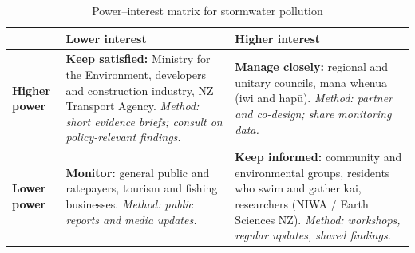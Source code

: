 \documentclass[11pt,a4paper]{article}
\begin{document}
\begin{table}[htbp]
  \centering
  \caption{Power--interest matrix for stormwater pollution}
  \label{tab:stakeholders}
  \renewcommand{\arraystretch}{1.25}
  \begin{tabularx}{\textwidth}{@{}l X X@{}}
    \toprule
    & \textbf{Lower interest} & \textbf{Higher interest} \\
    \midrule
    \textbf{Higher power} &
      \textbf{Keep satisfied:} Ministry for the Environment, developers and construction industry, NZ Transport Agency. \emph{Method: short evidence briefs; consult on policy-relevant findings.} &
      \textbf{Manage closely:} regional and unitary councils, mana whenua (iwi and hap\=u). \emph{Method: partner and co-design; share monitoring data.} \\
    \addlinespace
    \textbf{Lower power} &
      \textbf{Monitor:} general public and ratepayers, tourism and fishing businesses. \emph{Method: public reports and media updates.} &
      \textbf{Keep informed:} community and environmental groups, residents who swim and gather kai, researchers (NIWA / Earth Sciences NZ). \emph{Method: workshops, regular updates, shared findings.} \\
    \bottomrule
  \end{tabularx}
\end{table}
\end{document}
